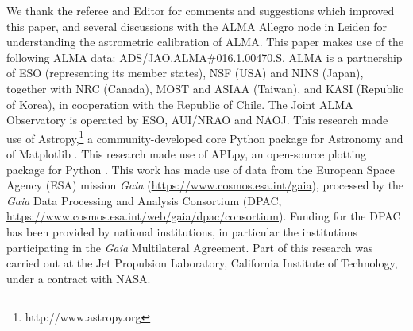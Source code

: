\documentclass{aa} %
\begin{document}
\begin{acknowledgements}

  We thank the referee and Editor for comments and suggestions which improved this paper, and several discussions with the ALMA Allegro node in Leiden for understanding the astrometric calibration of ALMA.
This paper makes use of the following ALMA data: ADS/JAO.ALMA\#016.1.00470.S. 
ALMA is a partnership of ESO (representing its member states), NSF (USA) and NINS (Japan), together with NRC (Canada), MOST and ASIAA (Taiwan), and KASI (Republic of Korea), in cooperation with the Republic of Chile.
The Joint ALMA Observatory is operated by ESO, AUI/NRAO and NAOJ.
%
This research made use of Astropy,\footnote{http://www.astropy.org} a community-developed core Python package for Astronomy \citep{astropy:2013, astropy:2018} and of Matplotlib \citep{Hunter:2007}.
This research made use of APLpy, an open-source plotting package for Python \citep{aplpy2012,aplpy2019}.
%
This work has made use of data from the European Space Agency (ESA) mission {\it Gaia} (\url{https://www.cosmos.esa.int/gaia}), processed by the {\it Gaia} Data Processing and Analysis Consortium (DPAC, \url{https://www.cosmos.esa.int/web/gaia/dpac/consortium}). Funding for the DPAC has been provided by national institutions, in particular the institutions participating in the {\it Gaia} Multilateral Agreement.
%
Part of this research was carried out at the Jet Propulsion Laboratory, California Institute of Technology, under a contract with NASA.
%
\end{acknowledgements}



\end{document}
